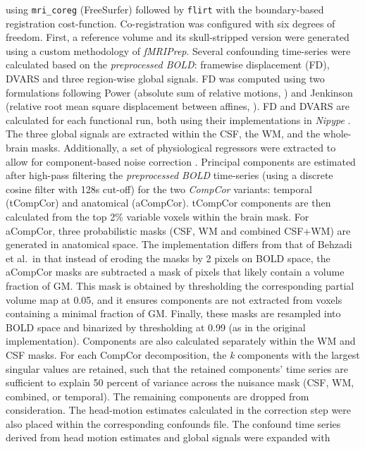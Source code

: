 \documentclass[
]{article}
\begin{document}
\begin{description}
using \texttt{mri\_coreg} (FreeSurfer) followed by \texttt{flirt}
\citep[FSL 6.0.5.1:57b01774,][]{flirt} with the boundary-based
registration \citep{bbr} cost-function. Co-registration was configured
with six degrees of freedom. First, a reference volume and its
skull-stripped version were generated using a custom methodology of
\emph{fMRIPrep}. Several confounding time-series were calculated based
on the \emph{preprocessed BOLD}: framewise displacement (FD), DVARS and
three region-wise global signals. FD was computed using two formulations
following Power (absolute sum of relative motions,
\citet{power_fd_dvars}) and Jenkinson (relative root mean square
displacement between affines, \citet{mcflirt}). FD and DVARS are
calculated for each functional run, both using their implementations in
\emph{Nipype} \citep[following the definitions by][]{power_fd_dvars}.
The three global signals are extracted within the CSF, the WM, and the
whole-brain masks. Additionally, a set of physiological regressors were
extracted to allow for component-based noise correction
\citep[\emph{CompCor},][]{compcor}. Principal components are estimated
after high-pass filtering the \emph{preprocessed BOLD} time-series
(using a discrete cosine filter with 128s cut-off) for the two
\emph{CompCor} variants: temporal (tCompCor) and anatomical (aCompCor).
tCompCor components are then calculated from the top 2\% variable voxels
within the brain mask. For aCompCor, three probabilistic masks (CSF, WM
and combined CSF+WM) are generated in anatomical space. The
implementation differs from that of Behzadi et al.~in that instead of
eroding the masks by 2 pixels on BOLD space, the aCompCor masks are
subtracted a mask of pixels that likely contain a volume fraction of GM.
This mask is obtained by thresholding the corresponding partial volume
map at 0.05, and it ensures components are not extracted from voxels
containing a minimal fraction of GM. Finally, these masks are resampled
into BOLD space and binarized by thresholding at 0.99 (as in the
original implementation). Components are also calculated separately
within the WM and CSF masks. For each CompCor decomposition, the
\emph{k} components with the largest singular values are retained, such
that the retained components' time series are sufficient to explain 50
percent of variance across the nuisance mask (CSF, WM, combined, or
temporal). The remaining components are dropped from consideration. The
head-motion estimates calculated in the correction step were also placed
within the corresponding confounds file. The confound time series
derived from head motion estimates and global signals were expanded with

\end{description}
\end{document}
